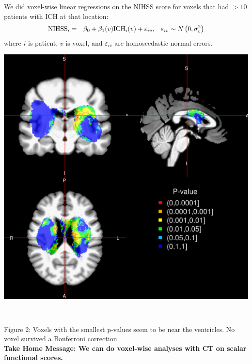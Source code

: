 \documentclass[final]{beamer}\usepackage[]{graphicx}\usepackage[]{color}
\begin{document}
\begin{frame}[fragile]
\begin{multicols}{2}
\begin{minipage}{.4\linewidth}
	We did voxel-wise linear regressions on the NIHSS score for voxels that had $> 10$ patients with ICH at that location:
	\begin{eqnarray}
	{\rm NIHSS}_i&=&\beta_0+\beta_1(v) {\rm ICH}_i(v) + \varepsilon_{iv},\;\;\; \varepsilon_{iv} \sim N\left(0, \sigma^2_v\right) \label{eq:vox}
	\end{eqnarray}
	where $i$ is patient, $v$ is voxel, and $\varepsilon_{iv}$ are homoscedastic normal errors.

\end{minipage}
\;\;
\begin{minipage}{.3\linewidth}
\includegraphics[width=.9\linewidth]{Regression_Map_heatcol1_t1.png}
\end{minipage}
~%
\begin{minipage}{.2\linewidth}
	{\color{color1} Figure 2:} Voxels with the smallest p-values seem to be near the ventricles.  No voxel survived a Bonferroni correction. \\	
	{\bf Take Home Message: We can do voxel-wise analyses with CT on scalar functional scores.}
\end{minipage}


\setcounter{figure}{2}

\vspace*{-.25cm}



\end{multicols}
\end{frame}
\end{document}
